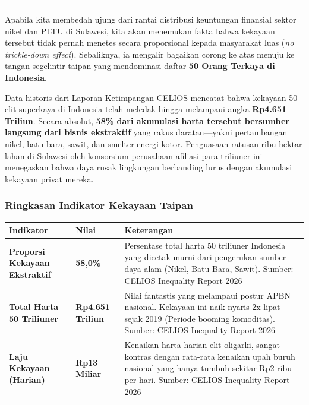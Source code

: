 \documentclass[
]{article}
\newcounter{none} %
\begin{document}
\begin{center}\rule{0.5\linewidth}{0.5pt}\end{center}

Apabila kita membedah ujung dari rantai distribusi keuntungan finansial
sektor nikel dan PLTU di Sulawesi, kita akan menemukan fakta bahwa
kekayaan tersebut tidak pernah menetes secara proporsional kepada
masyarakat luas (\emph{no trickle-down effect}). Sebaliknya, ia mengalir
bagaikan corong ke atas menuju ke tangan segelintir taipan yang
mendominasi daftar \textbf{50 Orang Terkaya di Indonesia}.

Data historis dari Laporan Ketimpangan CELIOS mencatat bahwa kekayaan 50
elit superkaya di Indonesia telah meledak hingga melampaui angka
\textbf{Rp4.651 Triliun}. Secara absolut, \textbf{58\% dari akumulasi
harta tersebut bersumber langsung dari bisnis ekstraktif} yang rakus
daratan---yakni pertambangan nikel, batu bara, sawit, dan smelter energi
kotor. Penguasaan ratusan ribu hektar lahan di Sulawesi oleh konsorsium
perusahaan afiliasi para triliuner ini menegaskan bahwa daya rusak
lingkungan berbanding lurus dengan akumulasi kekayaan privat mereka.

\subsubsection{Ringkasan Indikator Kekayaan
Taipan}\label{ringkasan-indikator-kekayaan-taipan}

{\def\LTcaptype{none} %
\begin{longtable}[]{@{}
  >{\raggedright\arraybackslash}p{}
  >{\raggedright\arraybackslash}p{}
  >{\raggedright\arraybackslash}p{}@{}}
\toprule\noalign{}
\begin{minipage}[b]{\linewidth}\raggedright
Indikator
\end{minipage} & \begin{minipage}[b]{\linewidth}\raggedright
Nilai
\end{minipage} & \begin{minipage}[b]{\linewidth}\raggedright
Keterangan
\end{minipage} \\
\midrule\noalign{}
\endhead
\bottomrule\noalign{}
\endlastfoot
\textbf{Proporsi Kekayaan Ekstraktif} & \textbf{58,0\%} & Persentase
total harta 50 triliuner Indonesia yang dicetak murni dari pengerukan
sumber daya alam (Nikel, Batu Bara, Sawit). Sumber: CELIOS Inequality
Report 2026 \\
\textbf{Total Harta 50 Triliuner} & \textbf{Rp4.651 Triliun} & Nilai
fantastis yang melampaui postur APBN nasional. Kekayaan ini naik nyaris
2x lipat sejak 2019 (Periode booming komoditas). Sumber: CELIOS
Inequality Report 2026 \\
\textbf{Laju Kekayaan (Harian)} & \textbf{Rp13 Miliar} & Kenaikan harta
harian elit oligarki, sangat kontras dengan rata-rata kenaikan upah
buruh nasional yang hanya tumbuh sekitar Rp2 ribu per hari. Sumber:
CELIOS Inequality Report 2026 \\
\end{longtable}
}
\end{document}
